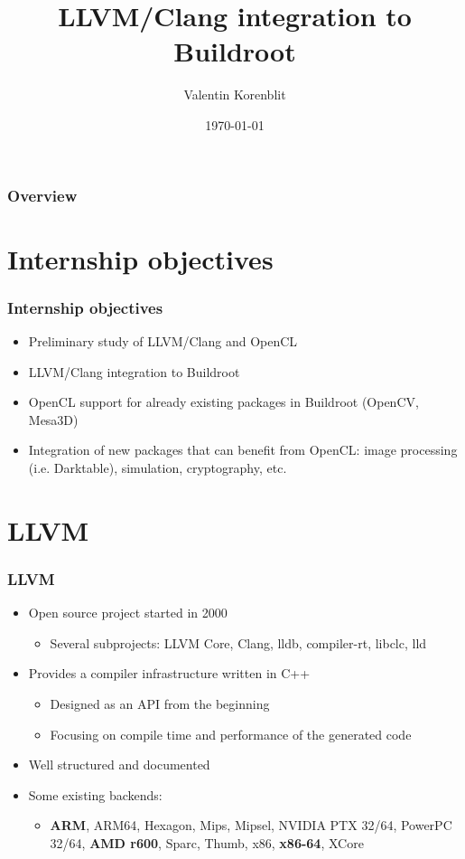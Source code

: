 \documentclass{beamer}
\title[LLVM/Clang + Buildroot]{LLVM/Clang integration to Buildroot}
\author{Valentin Korenblit}
\institute[Smile]
{
Smile \\~\\
\medskip
\textit{valentin.korenblit@smile.fr}
}
\date{\today}
\begin{document}
\begin{frame}
\titlepage
\end{frame}

\begin{frame}
\frametitle{Overview}
\tableofcontents
\end{frame}

\section{Internship objectives}

\begin{frame}
\frametitle{Internship objectives}
\begin{itemize}
  \item Preliminary study of LLVM/Clang and OpenCL
  \item LLVM/Clang integration to Buildroot
  \item OpenCL support for already existing packages in Buildroot (OpenCV, Mesa3D)
  \item Integration of new packages that can benefit from OpenCL: image processing (i.e. Darktable), simulation, cryptography, etc.
\end{itemize}
\end{frame}
\section{LLVM}

\begin{frame}
\frametitle{LLVM}
\begin{itemize}
  \item Open source project started in 2000
  \begin{itemize}
    \item Several subprojects: LLVM Core, Clang, lldb, compiler-rt, libclc, lld
  \end{itemize}
  \item Provides a compiler infrastructure written in C++
  \begin{itemize}
    \item Designed as an API from the beginning
    \item Focusing on compile time and performance of the generated code
  \end{itemize}
  \item Well structured and documented
  \item Some existing backends:
  \begin{itemize}
    \item \textbf{ARM}, ARM64, Hexagon, Mips, Mipsel, NVIDIA PTX 32/64, PowerPC 32/64, \textbf{AMD r600}, Sparc, Thumb, x86, \textbf{x86-64}, XCore
  \end{itemize}
\end{itemize}
\end{frame}
\end{document}
